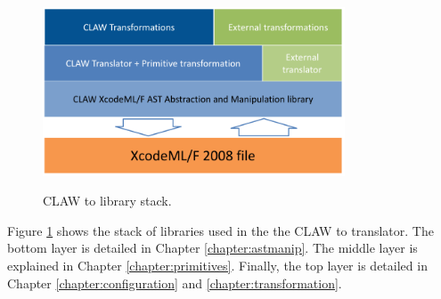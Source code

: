 \begin{figure}[!ht]
  \centering
  \includegraphics[width=0.8\textwidth]{resources/cx2x_stack.png} \\
  \caption{CLAW \xcodeml to \xcodeml library stack.}
  \label{fig:cx2x_stack}
\end{figure}

Figure \ref{fig:cx2x_stack} shows the stack of libraries used in the the CLAW
\xcodeml to \xcodeml translator. The bottom layer is detailed in Chapter
\ref{chapter:astmanip}. The middle layer is explained in Chapter
\ref{chapter:primitives}. Finally, the top layer is detailed in Chapter
\ref{chapter:configuration} and \ref{chapter:transformation}.
